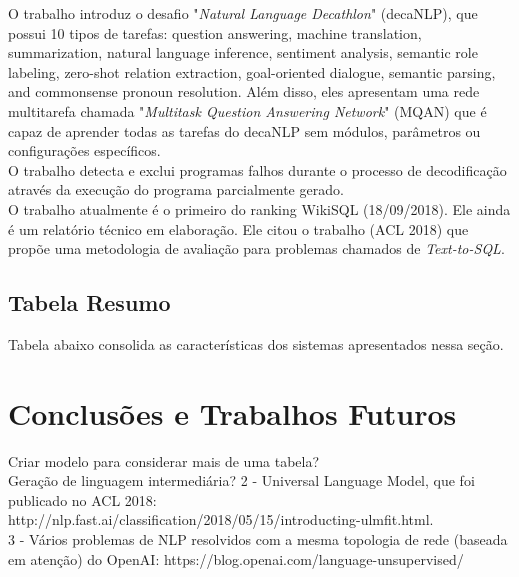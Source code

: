 \documentclass{article}
\begin{document}
O trabalho \cite{mccann2018natural} introduz o desafio "\textit{Natural Language Decathlon}" (decaNLP), que possui 10 tipos de tarefas: question answering, machine translation, summarization, natural language inference, sentiment analysis, semantic role labeling, zero-shot relation extraction, goal-oriented dialogue, semantic parsing, and commonsense pronoun resolution. Além disso, eles apresentam uma rede multitarefa chamada "\textit{Multitask Question Answering Network}" (MQAN) que é capaz de aprender todas as tarefas do decaNLP sem módulos, parâmetros ou configurações específicos. \\

O trabalho \citep{2018arXiv180703100W} detecta e exclui programas falhos durante o processo de decodificação através da execução do programa parcialmente gerado. \\

O trabalho \citep{shi2018incsql} atualmente é o primeiro do ranking WikiSQL (18/09/2018). Ele ainda é um relatório técnico em elaboração. Ele citou o trabalho \citep{finegan2018improving} (ACL 2018) que propõe uma metodologia de avaliação para problemas chamados de \textit{Text-to-SQL}.\\




\subsection{Tabela Resumo}

Tabela abaixo consolida as características dos sistemas apresentados nessa seção.


\section{Conclusões e Trabalhos Futuros}

Criar modelo para considerar mais de uma tabela?\\

Geração de linguagem intermediária? 2 - Universal Language Model, que foi publicado no ACL 2018: http://nlp.fast.ai/classification/2018/05/15/introducting-ulmfit.html.\\

3 - Vários problemas de NLP resolvidos com a mesma topologia de rede (baseada em atenção) do OpenAI: https://blog.openai.com/language-unsupervised/\\
\end{document}
